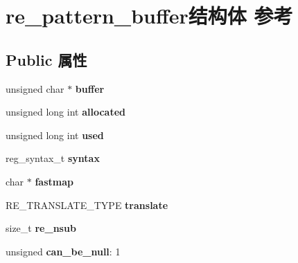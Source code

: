 \hypertarget{structre__pattern__buffer}{}\section{re\+\_\+pattern\+\_\+buffer结构体 参考}
\label{structre__pattern__buffer}
\subsection*{Public 属性}
\begin{DoxyCompactItemize}
\item 
\mbox{\label{structre__pattern__buffer_ae60c7055854785bf6e2743fd314fcb83}} 
unsigned char $\ast$ {\bfseries buffer}
\item 
\mbox{\label{structre__pattern__buffer_a2947439f970297ce6f4a439867c0b5c7}} 
unsigned long int {\bfseries allocated}
\item 
\mbox{\label{structre__pattern__buffer_a5c6bb086f4bfebee8aa4373c03bcc74b}} 
unsigned long int {\bfseries used}
\item 
\mbox{\label{structre__pattern__buffer_aa16e95a1befa7d5fd8eb89542fa065f8}} 
reg\+\_\+syntax\+\_\+t {\bfseries syntax}
\item 
\mbox{\label{structre__pattern__buffer_a103ac216c8fd6a8734daa4999fca3efb}} 
char $\ast$ {\bfseries fastmap}
\item 
\mbox{\label{structre__pattern__buffer_a780f81d1ec1ebba869e138b5bc849658}} 
R\+E\+\_\+\+T\+R\+A\+N\+S\+L\+A\+T\+E\+\_\+\+T\+Y\+PE {\bfseries translate}
\item 
\mbox{\label{structre__pattern__buffer_a703c2069a09bac7fa67de8871cb17d35}} 
size\+\_\+t {\bfseries re\+\_\+nsub}
\item 
\mbox{\label{structre__pattern__buffer_a13807f7bf4b32d786eb9e17a3c4d3124}} 
unsigned {\bfseries can\+\_\+be\+\_\+null}\+: 1
\item 
\mbox{\label{structre__pattern__buffer_a83388321c434be6ac33fe359a3d7b449}} 

\end{DoxyCompactItemize}
